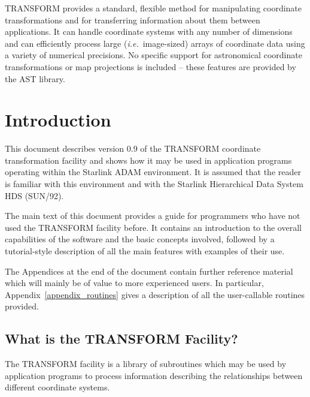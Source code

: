 \documentclass[twoside,11pt]{article}
\newcommand{\stardocinitials}  {SUN}
\newcommand{\stardocnumber}    {61.3}
\newcommand{\stardocabstract}  {%

TRANSFORM provides a standard, flexible method for manipulating
coordinate transformations and for transferring information about them
between applications.  It can handle coordinate systems with any number
of dimensions and can efficiently process large
(\emph{i.e.}\ image-sized) arrays of coordinate data using a variety of
numerical precisions.  No specific support for astronomical coordinate
transformations or map projections is included -- these features are
provided by the \xref{AST}{sun210}{} library.

}
\newcommand{\stardocname}{\stardocinitials /\stardocnumber}
\newenvironment{latexonly}{}{}
\newcommand{\xref}[3]{#1}
\newcommand{\xlabel}[1]{}
\newcommand{\latexonlytoc}[0]{\tableofcontents}
\newcommand{\name}[1]{\mbox{\small{#1}}}
\renewcommand{\thepage}{\roman{page}}
\begin{document}
\stardocabstract
  \newpage
  \begin{latexonly}
    \setlength{\parskip}{0mm}
    \latexonlytoc
    \setlength{\parskip}{\medskipamount}
    \markboth{\stardocname}{\stardocname}
  \end{latexonly}
\cleardoublepage
\renewcommand{\thepage}{\arabic{page}}
\setcounter{page}{1}


\section{\xlabel{introduction}Introduction}

This document describes version 0.9 of the \name{TRANSFORM} coordinate
transformation facility and shows how it may be used in application programs
operating within the Starlink \name{ADAM} environment. 
It is assumed that the reader is familiar with this environment and with the
Starlink Hierarchical Data System \name{HDS} (\xref{SUN/92}{sun92}{}). 

The main text of this document provides a guide for programmers who have not 
used the \name{TRANSFORM} facility before.
It contains an introduction to the overall capabilities of the software and
the basic concepts involved, followed by a tutorial-style description of all
the main features with examples of their use. 

The Appendices at the end of the document contain further reference material
which will mainly be of value to more experienced users.
In particular, Appendix~\ref{appendix_routines} gives a description of all 
the user-callable routines provided.


\subsection{\xlabel{what_is_the_nametransform_facility}What is the \name{TRANSFORM} Facility?}

The \name{TRANSFORM} facility is a library of subroutines which may be used
by application programs to process information describing the relationships
between different coordinate systems. 
\end{document}
